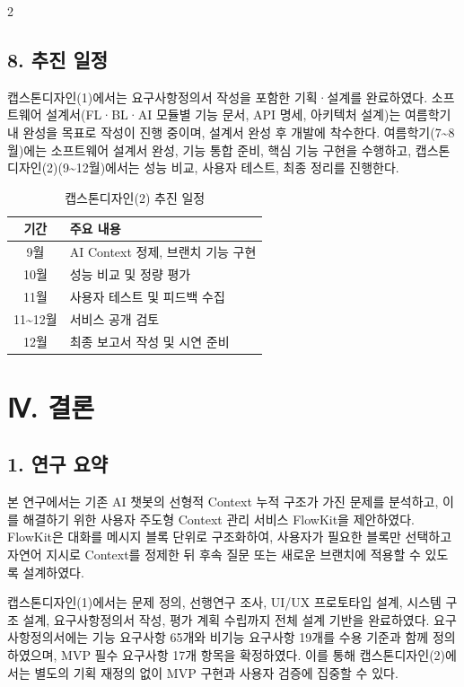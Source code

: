 \documentclass[10pt, a4paper]{article}
\begin{document}
\begin{multicols}{2}
\subsection*{8. 추진 일정}

캡스톤디자인(1)에서는 요구사항정의서 작성을 포함한 기획·설계를 완료하였다. 소프트웨어 설계서(FL·BL·AI 모듈별 기능 문서, API 명세, 아키텍처 설계)는 여름학기 내 완성을 목표로 작성이 진행 중이며, 설계서 완성 후 개발에 착수한다. 여름학기(7\textasciitilde8월)에는 소프트웨어 설계서 완성, 기능 통합 준비, 핵심 기능 구현을 수행하고, 캡스톤디자인(2)(9\textasciitilde12월)에서는 성능 비교, 사용자 테스트, 최종 정리를 진행한다.

\begin{table}[H]
\centering
\caption{캡스톤디자인(2) 추진 일정}
\label{tab:schedule}
\small
\begin{tabularx}{\columnwidth}{@{} c X @{}}
\toprule
\textbf{기간} & \textbf{주요 내용} \\
\midrule
9월       & AI Context 정제, 브랜치 기능 구현 \\
10월      & 성능 비교 및 정량 평가 \\
11월      & 사용자 테스트 및 피드백 수집 \\
11\textasciitilde12월 & 서비스 공개 검토 \\
12월      & 최종 보고서 작성 및 시연 준비 \\
\bottomrule
\end{tabularx}
\end{table}

\section*{Ⅳ. 결론}

\subsection*{1. 연구 요약}

본 연구에서는 기존 AI 챗봇의 선형적 Context 누적 구조가 가진 문제를 분석하고, 이를 해결하기 위한 사용자 주도형 Context 관리 서비스 FlowKit을 제안하였다. FlowKit은 대화를 메시지 블록 단위로 구조화하여, 사용자가 필요한 블록만 선택하고 자연어 지시로 Context를 정제한 뒤 후속 질문 또는 새로운 브랜치에 적용할 수 있도록 설계하였다.

캡스톤디자인(1)에서는 문제 정의, 선행연구 조사, UI/UX 프로토타입 설계, 시스템 구조 설계, 요구사항정의서 작성, 평가 계획 수립까지 전체 설계 기반을 완료하였다. 요구사항정의서에는 기능 요구사항 65개와 비기능 요구사항 19개를 수용 기준과 함께 정의하였으며, MVP 필수 요구사항 17개 항목을 확정하였다. 이를 통해 캡스톤디자인(2)에서는 별도의 기획 재정의 없이 MVP 구현과 사용자 검증에 집중할 수 있다.


\end{multicols}
\end{document}
